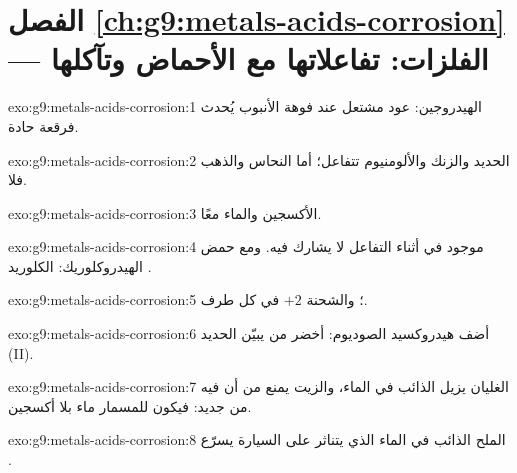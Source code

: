 \section*{الفصل \ref{ch:g9:metals-acids-corrosion} --- الفلزات: تفاعلاتها مع الأحماض وتآكلها}

\begin{solution}{exo:g9:metals-acids-corrosion:1}
الهيدروجين: عود مشتعل عند فوهة الأنبوب يُحدث فرقعة حادة.
\end{solution}

\begin{solution}{exo:g9:metals-acids-corrosion:2}
الحديد والزنك والألومنيوم تتفاعل؛ أما النحاس والذهب فلا.
\end{solution}

\begin{solution}{exo:g9:metals-acids-corrosion:3}
الأكسجين والماء معًا.
\end{solution}

\begin{solution}{exo:g9:metals-acids-corrosion:4}
 موجود في أثناء التفاعل لا يشارك فيه. ومع حمض الهيدروكلوريك: 
الكلوريد .
\end{solution}

\begin{solution}{exo:g9:metals-acids-corrosion:5}
؛ والشحنة $+2$ في كل طرف.
\end{solution}

\begin{solution}{exo:g9:metals-acids-corrosion:6}
أضف هيدروكسيد الصوديوم:  أخضر من  يبيّن 
الحديد (II).
\end{solution}

\begin{solution}{exo:g9:metals-acids-corrosion:7}
الغليان يزيل  الذائب في الماء، والزيت يمنع  من أن  فيه من
جديد: فيكون للمسمار ماء بلا أكسجين.
\end{solution}

\begin{solution}{exo:g9:metals-acids-corrosion:8}
الملح الذائب في الماء الذي يتناثر على السيارة يسرّع .
\end{solution}


